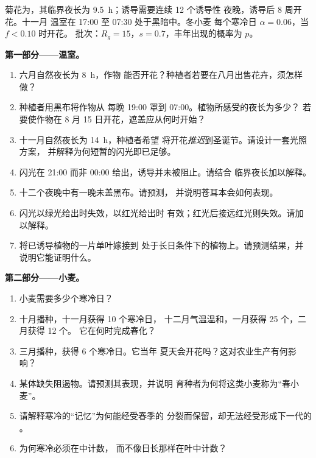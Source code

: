 \begin{problem}
\label{pb:b2:plant-flowering:1}
菊花为，其临界夜长为
\qty{9.5}{h}；诱导需要连续 \num{12} 个诱导性
夜晚，诱导后 \num{8} 周开花。十一月
温室在 17:00 至 07:30 处于黑暗中。冬小麦
每个寒冷日 $\alpha = 0.06$，当 $f < 0.10$ 时开花。
批次：$R_g = 15$，$s = 0.7$，丰年出现的概率为 $p$。

\medskip
\noindent\textbf{第一部分——温室。}
\begin{enumerate}
  \item 六月自然夜长为 \qty{8}{h}，作物
        能否开花？种植者若要在八月出售花卉，须怎样做？
  \item 种植者用黑布将作物从
        每晚 19:00 罩到 07:00。植物所感受的夜长为多少？
        若要使作物在
        8 月 15 日开花，遮盖应从何时开始？
  \item 十一月自然夜长为 \qty{14}{h}，种植者希望
        将开花\emph{推迟}到圣诞节。请设计一套光照方案，
        并解释为何短暂的闪光即已足够。
  \item 闪光在 21:00 而非
        00:00 给出，诱导并未被阻止。请结合
        临界夜长加以解释。
  \item 十二个夜晚中有一晚未盖黑布。请预测，
        并说明苍耳本会如何表现。
  \item 闪光以绿光给出时失效，以红光给出时
        有效；红光后接远红光则失效。请加以解释。
  \item 将已诱导植物的一片单叶嫁接到
        处于长日条件下的植物上。请预测结果，并说明它能证明什么。
\end{enumerate}

\medskip
\noindent\textbf{第二部分——小麦。}
\begin{enumerate}[resume]
  \item 小麦需要多少个寒冷日？
  \item 十月播种，十一月获得 10 个寒冷日，
        十二月气温温和，一月获得 25 个，二月获得 12 个。
        它在何时完成春化？
  \item 三月播种，获得 6 个寒冷日。它当年
        夏天会开花吗？这对农业生产有何影响？
  \item 某体缺失阻遏物。请预测其表现，并说明
        育种者为何将这类小麦称为“春小麦”。
  \item 请解释寒冷的“记忆”为何能经受春季的
        分裂而保留，却无法经受形成下一代的
        。
  \item 为何寒冷必须在中计数，
        而不像日长那样在叶中计数？
\end{enumerate}


\end{problem}
